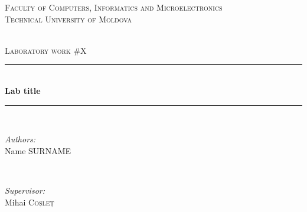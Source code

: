\documentclass[12pt,a4paper,titlepage]{article}
\begin{document}
\begin{titlepage}

  \begin{center} %

  \textsc{\large Faculty of Computers, Informatics and Microelectronics}\\[0.5cm]
  \textsc{\large Technical University of Moldova}\\[1.2cm] %
  \vspace{25 mm}

  \textsc{\Large }\\[0.5cm] %
  \textsc{\large Laboratory work \#X}\\[0.5cm] %

\newcommand{\HRule}{\rule{\linewidth}{0.5mm}} %

  \vspace{10 mm}
  \HRule \\[0.4cm]
  { \LARGE \bfseries Lab title  }\\[0.4cm] %
  \HRule \\[1.5cm]

      \vspace{30mm}

      \begin{minipage}{0.4\textwidth}
      \begin{flushleft} \large
      \emph{Authors:}\\
      Name \textsc{SURNAME}
      \end{flushleft}
      \end{minipage}
      ~
      \begin{minipage}{0.4\textwidth}
      \begin{flushright} \large
      \emph{Supervisor:} \\
      Mihai \textsc{Coșleț} %
      \end{flushright}
      \end{minipage}\\[4cm]


\end{center}
\end{titlepage}
\end{document}
